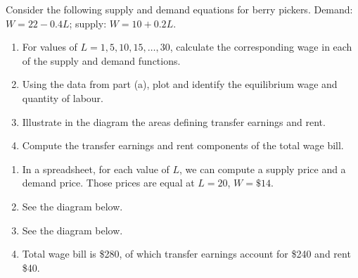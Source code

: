 \begin{enumialphparenastyle}
\begin{econex}\label{ex:ch12ex3}
Consider the following supply and demand equations for berry pickers. Demand: $W=22-0.4L$; supply: $W=10+0.2L$.
\begin{enumerate}
\item	For values of $L=1,5,10,15,\ldots,30$, calculate the corresponding wage in each of the supply and demand functions.
\item	Using the data from part (a), plot and identify the equilibrium wage and quantity of labour.
\item	Illustrate in the diagram the areas defining transfer earnings and rent.
\item	Compute the transfer earnings and rent components of the total wage bill.
\end{enumerate}
\begin{econsolution}
\begin{enumerate}
\item	In a spreadsheet, for each value of $L$, we can compute a supply price and a demand price. Those prices are equal at $L=20$, $W=\$14$.
\item	See the diagram below.
\item	See the diagram below.
\item	Total wage bill is \$280, of which transfer earnings account for \$240 and rent \$40.
\end{enumerate}
\begin{center*}
\end{center*}
\end{econsolution}
\end{econex}


\end{enumialphparenastyle}
